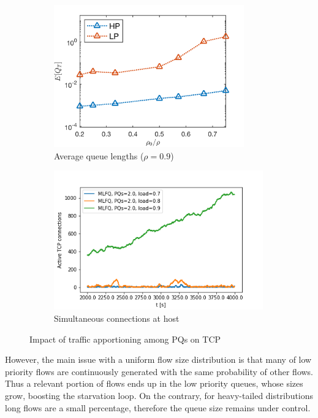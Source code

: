 \begin{figure}
	\centering
	\begin{subfigure}{.45\textwidth}
		\centering
		\includegraphics[width=0.9\textwidth]{Chapter4/Figures/qt_vs_thresh}
		\caption{Average queue lengths ($\rho=0.9$)}
		\label{fig:qt-vs-threshold}
	\end{subfigure}%
	\hfill
	\begin{subfigure}{.55\textwidth}
		\centering
		\includegraphics[width=0.99\textwidth]{Chapter4/Figures/active-connections}
		\caption{Simultaneous connections at host}
		\label{fig:active-connections}
	\end{subfigure}%
	\caption{Impact of traffic apportioning among PQs on TCP}
	\label{fig:uniform-traffic-sp-tcp}
\end{figure}%
However, the main issue with a uniform flow size distribution is that many of low priority flows are continuously generated with the same probability of other flows. Thus a relevant portion of flows ends up in the low priority queues, whose sizes grow, boosting the starvation loop. On the contrary, for heavy-tailed distributions long flows are a small percentage, therefore the queue size remains under control. \\
